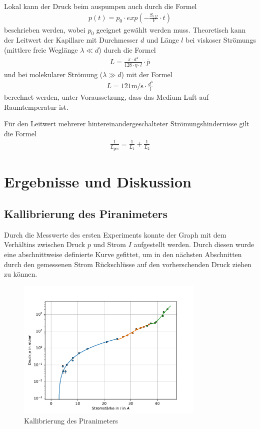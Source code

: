 \documentclass[11pt, a4paper]{article}
\begin{document}
    Lokal kann der Druck beim auspumpen auch durch die Formel
    \begin{align}
        p\left(t\right) = p_0 \cdot exp\left(- \frac{S_{eff}}{V} \cdot t\right)
    \end{align}
    beschrieben werden, wobei $p_0$ geeignet gewählt werden muss.
    Theoretisch kann der Leitwert der Kapillare mit Durchmesser $d$ und Länge $l$ bei viskoser Strömungs (mittlere freie Weglänge $\lambda \ll d$) durch die Formel
    \begin{align}
        L = \frac{\pi \cdot d^4}{128 \cdot \eta \cdot l} \cdot \bar{p} \label{leitvisk}
    \end{align}
    und bei molekularer Strömung ($\lambda \gg d$) mit der Formel
    \begin{align}
        L = 121 \si{\meter\per\second} \cdot \frac{d^3}{l}
    \end{align}
    berechnet werden, unter Voraussetzung, dass das Medium Luft auf Raumtemperatur ist.

    Für den Leitwert mehrerer hintereinandergeschalteter Strömungshindernisse gilt die Formel
    \begin{align}
        \frac{1}{L_{ges}} = \frac{1}{L_1} + \frac{1}{L_2}
    \end{align}






    \section{Ergebnisse und Diskussion}
    \subsection{Kallibrierung des Piranimeters}
    Durch die Messwerte des ersten Experiments konnte der Graph mit dem Verhältins zwischen Druck $p$ und Strom $I$ aufgestellt werden. Durch diesen wurde eine abschnittweise definierte Kurve gefittet, um in den nächsten Abschnitten durch den gemessenen Strom Rückschlüsse auf den vorherschenden Druck ziehen zu können.
    \begin{figure}[h]
        \centering
        \includegraphics[width=0.8\textwidth]{Kallibrierung.pdf}
        \caption{Kallibrierung des Piranimeters}
        \label{fig:piranim}
    \end{figure}
\end{document}
